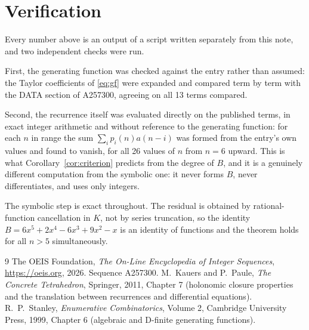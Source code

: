 \documentclass[11pt,a4paper]{article}
\theoremstyle{plain}
\theoremstyle{definition}
\begin{document}
\section{Verification}

Every number above is an output of a script written separately from this note, and two
independent checks were run.

First, the generating function was checked against the entry rather than assumed: the
Taylor coefficients of \eqref{eq:gf} were expanded and compared term by term with the DATA
section of A257300, agreeing on all 13 terms compared.

Second, the recurrence itself was evaluated directly on the published terms, in exact
integer arithmetic and without reference to the generating function: for each $n$ in range
the sum $\sum_{i}p_{i}(n)a(n-i)$ was formed from the entry's own values and found to
vanish, for all 26 values of $n$ from $n=6$ upward. This is what
Corollary~\ref{cor:criterion} predicts from the degree of $B$, and it is a genuinely
different computation from the symbolic one: it never forms $B$, never differentiates, and
uses only integers.

The symbolic step is exact throughout. The residual is obtained by rational-function
cancellation in $K$, not by series truncation, so the identity $B=6 x^{5} + 2 x^{4} - 6 x^{3} + 9 x^{2} - x$ is an
identity of functions and the theorem holds for all $n>5$ simultaneously.

\begin{thebibliography}{9}
 The OEIS Foundation, \emph{The On-Line Encyclopedia of Integer Sequences},
\url{https://oeis.org}, 2026. Sequence A257300.
 M.~Kauers and P.~Paule, \emph{The Concrete Tetrahedron}, Springer, 2011,
Chapter 7 (holonomic closure properties and the translation between recurrences and
differential equations).
 R.~P.~Stanley, \emph{Enumerative Combinatorics}, Volume 2, Cambridge
University Press, 1999, Chapter 6 (algebraic and D-finite generating functions).
\end{thebibliography}
\end{document}
